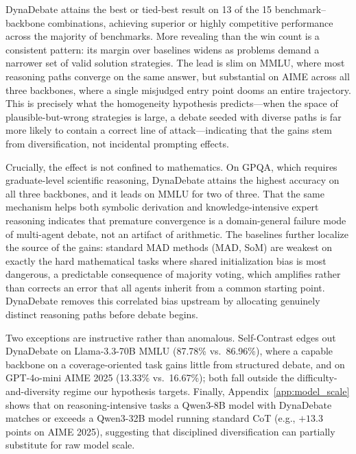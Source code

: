 DynaDebate attains the best or tied-best result on 13 of the 15 benchmark--backbone combinations, achieving superior or highly competitive performance across the majority of benchmarks. More revealing than the win count is a consistent pattern: its margin over baselines widens as problems demand a narrower set of valid solution strategies. The lead is slim on MMLU, where most reasoning paths converge on the same answer, but substantial on AIME across all three backbones, where a single misjudged entry point dooms an entire trajectory. This is precisely what the homogeneity hypothesis predicts---when the space of plausible-but-wrong strategies is large, a debate seeded with diverse paths is far more likely to contain a correct line of attack---indicating that the gains stem from diversification, not incidental prompting effects.

Crucially, the effect is not confined to mathematics. On GPQA, which requires graduate-level scientific reasoning, DynaDebate attains the highest accuracy on all three backbones, and it leads on MMLU for two of three. That the same mechanism helps both symbolic derivation and knowledge-intensive expert reasoning indicates that premature convergence is a domain-general failure mode of multi-agent debate, not an artifact of arithmetic. The baselines further localize the source of the gains: standard MAD methods (MAD, SoM) are weakest on exactly the hard mathematical tasks where shared initialization bias is most dangerous, a predictable consequence of majority voting, which amplifies rather than corrects an error that all agents inherit from a common starting point. DynaDebate removes this correlated bias upstream by allocating genuinely distinct reasoning paths before debate begins.

Two exceptions are instructive rather than anomalous. Self-Contrast edges out DynaDebate on Llama-3.3-70B MMLU (87.78\% vs.\ 86.96\%), where a capable backbone on a coverage-oriented task gains little from structured debate, and on GPT-4o-mini AIME 2025 (13.33\% vs.\ 16.67\%); both fall outside the difficulty-and-diversity regime our hypothesis targets. Finally, Appendix~\ref{app:model_scale} shows that on reasoning-intensive tasks a Qwen3-8B model with DynaDebate matches or exceeds a Qwen3-32B model running standard CoT (e.g., $+13.3$ points on AIME 2025), suggesting that disciplined diversification can partially substitute for raw model scale.



